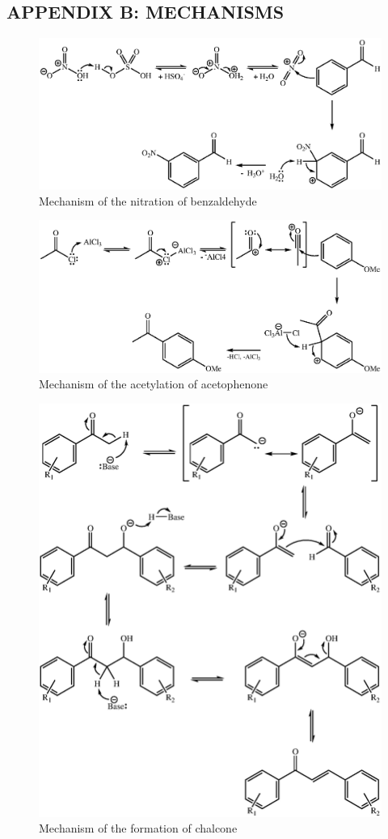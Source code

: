 \documentclass[12pt]{article}
\begin{document}
\subsection*{APPENDIX B: MECHANISMS}
\begin{figure}[ht]
    \centering
    \includegraphics[scale=0.8]{mechanisms/nitration.eps}
    \caption{Mechanism of the nitration of benzaldehyde}
\end{figure}
\vspace{15mm}
\begin{figure}[h!]
    \centering
    \includegraphics[scale=0.8]{mechanisms/acetylation.eps}
    \caption{Mechanism of the acetylation of acetophenone}
\end{figure}
\begin{figure}[H]
    \centering
    \includegraphics[scale=0.8]{mechanisms/chalcone.eps}
    \caption{Mechanism of the formation of chalcone}
\end{figure}
\end{document}
